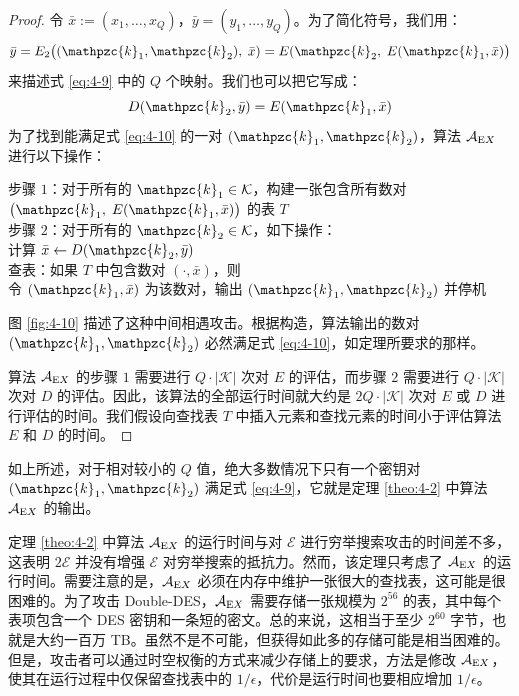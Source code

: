 \begin{proof}
令 $\bar{x}:=(x_1,\dots,x_Q)$，$\bar{y}=(y_1,\dots,y_Q)$。为了简化符号，我们用：
\[
\bar y=E_2\big((\mathpzc{k}_1,\mathpzc{k}_2),\;\bar x)=E(\mathpzc{k}_2,\;E(\mathpzc{k}_1,\bar x)\big)
\]
来描述式 \ref{eq:4-9} 中的 $Q$ 个映射。我们也可以把它写成：
\begin{equation}\label{eq:4-10}
D(\mathpzc{k}_2,\bar y)=E(\mathpzc{k}_1,\bar x)
\end{equation}
为了找到能满足式 \ref{eq:4-10} 的一对 $(\mathpzc{k}_1,\mathpzc{k}_2)$，算法 $\mathcal{A}_{{\rm E}X}$ 进行以下操作：

\vspace*{5pt}

\hspace*{5pt} 步骤 $1$：对于所有的 $\mathpzc{k}_1\in\mathcal{K}$，构建一张包含所有数对 $\big(\mathpzc{k}_1,\;E(\mathpzc{k}_1,\bar x)\big)$ 的表 $T$\\
\hspace*{26pt} 步骤 $2$：对于所有的 $\mathpzc{k}_2\in\mathcal{K}$，如下操作：\\
\hspace*{80pt} 计算 $\bar x\leftarrow D(\mathpzc{k}_2,\bar y)$\\
\hspace*{80pt} 查表：如果 $T$ 中包含数对 $(\cdot,\bar x)$，则\\
\hspace*{112pt} 令 $(\mathpzc{k}_1,\bar x)$ 为该数对，输出 $(\mathpzc{k}_1,\mathpzc{k}_2)$ 并停机

\vspace*{5pt}

\noindent
图 \ref{fig:4-10} 描述了这种中间相遇攻击。根据构造，算法输出的数对 $(\mathpzc{k}_1,\mathpzc{k}_2)$ 必然满足式 \ref{eq:4-10}，如定理所要求的那样。

算法 $\mathcal{A}_{{\rm E}X}$ 的步骤 $1$ 需要进行 $Q\cdot|\mathcal{K}|$ 次对 $E$ 的评估，而步骤 $2$ 需要进行 $Q\cdot|\mathcal{K}|$ 次对 $D$ 的评估。因此，该算法的全部运行时间就大约是 $2Q\cdot|\mathcal{K}|$ 次对 $E$ 或 $D$ 进行评估的时间。我们假设向查找表 $T$ 中插入元素和查找元素的时间小于评估算法 $E$ 和 $D$ 的时间。
\end{proof}

如上所述，对于相对较小的 $Q$ 值，绝大多数情况下只有一个密钥对 $(\mathpzc{k}_1,\mathpzc{k}_2)$ 满足式 \ref{eq:4-9}，它就是定理 \ref{theo:4-2} 中算法 $\mathcal{A}_{{\rm E}X}$ 的输出。

定理 \ref{theo:4-2} 中算法 $\mathcal{A}_{{\rm E}X}$ 的运行时间与对 $\mathcal{E}$ 进行穷举搜索攻击的时间差不多，这表明 $2\mathcal{E}$ 并没有增强 $\mathcal{E}$ 对穷举搜索的抵抗力。然而，该定理只考虑了 $\mathcal{A}_{{\rm E}X}$ 的运行时间。需要注意的是，$\mathcal{A}_{{\rm E}X}$ 必须在内存中维护一张很大的查找表，这可能是很困难的。为了攻击 Double-DES，$\mathcal{A}_{{\rm E}X}$ 需要存储一张规模为 $2^{56}$ 的表，其中每个表项包含一个 DES 密钥和一条短的密文。总的来说，这相当于至少 $2^{60}$ 字节，也就是大约一百万 TB。虽然不是不可能，但获得如此多的存储可能是相当困难的。但是，攻击者可以通过时空权衡的方式来减少存储上的要求，方法是修改 $\mathcal{A}_{{\rm E}X}$，使其在运行过程中仅保留查找表中的 ${1}/{\epsilon}$，代价是运行时间也要相应增加 ${1}/{\epsilon}$。


